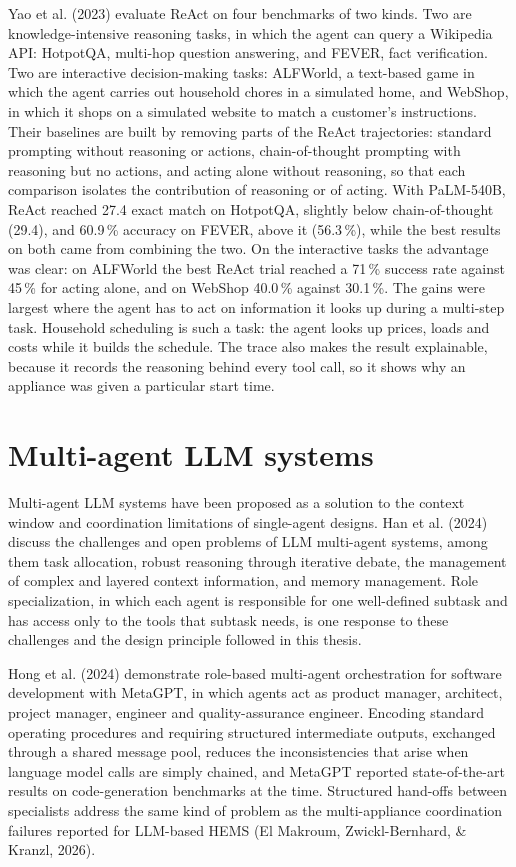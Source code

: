 \documentclass[12pt,a4paper]{report}
\begin{document}
Yao et al. (2023) evaluate ReAct on four benchmarks of two kinds. Two are
knowledge-intensive reasoning tasks, in which the agent can query a
Wikipedia API: HotpotQA, multi-hop question answering, and FEVER, fact
verification. Two are interactive decision-making tasks: ALFWorld, a
text-based game in which the agent carries out household chores in a
simulated home, and WebShop, in which it shops on a simulated website to
match a customer's instructions. Their baselines are built by removing
parts of the ReAct trajectories: standard prompting without reasoning or
actions, chain-of-thought prompting with reasoning but no actions, and
acting alone without reasoning, so that each comparison isolates the
contribution of reasoning or of acting. With PaLM-540B, ReAct reached 27.4
exact match on HotpotQA, slightly below chain-of-thought (29.4), and
60.9\,\% accuracy on FEVER, above it (56.3\,\%), while the best results on both
came from combining the two. On the interactive tasks the advantage was
clear: on ALFWorld the best ReAct trial reached a 71\,\% success rate
against 45\,\% for acting alone, and on WebShop 40.0\,\% against 30.1\,\%.
The gains were largest where the agent has to act on information it
looks up during a multi-step task. Household scheduling is such a task:
the agent looks up prices, loads and costs while it builds the schedule.
The trace also makes the result explainable, because it records the
reasoning behind every tool call, so it shows why an appliance was given
a particular start time.

\section{Multi-agent LLM systems}
\label{sec:multi-agent}

Multi-agent LLM systems have been proposed as a solution to the context
window and coordination limitations of single-agent designs. Han et al.
(2024) discuss the challenges and open problems of LLM multi-agent
systems, among them task allocation, robust reasoning through iterative
debate, the management of complex and layered context information, and
memory management. Role specialization, in which each agent is
responsible for one well-defined subtask and has access only to the
tools that subtask needs, is one response to these challenges and the
design principle followed in this thesis.

Hong et al. (2024) demonstrate role-based multi-agent orchestration for
software development with MetaGPT, in which agents act as product
manager, architect, project manager, engineer and quality-assurance
engineer. Encoding standard operating procedures and requiring
structured intermediate outputs, exchanged through a shared message
pool, reduces the inconsistencies that arise when language model calls
are simply chained, and MetaGPT reported state-of-the-art results on
code-generation benchmarks at the time. Structured hand-offs between
specialists address the same kind of problem as the multi-appliance
coordination failures reported for LLM-based HEMS (El Makroum,
Zwickl-Bernhard, \& Kranzl, 2026).
\end{document}
